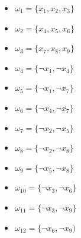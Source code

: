 \documentclass{beamer}
\begin{document}
\begin{frame}
\begin{columns}[t]
\begin{column}[T]{.6\textwidth}
\begin{tikzpicture}[scale=0.8, every node/.style={scale=0.8}]
\end{tikzpicture}
\end{column}
\begin{column}[T]{.4\textwidth}
	\scriptsize
	\begin{itemize} 
	\item[] $\omega_{1} = \{x_1  ,  x_2  ,  x_3\}$
	\item[] $\omega_{2} = \{x_4  ,  x_5  ,  x_6\} $
	\item[] $\omega_{3} = \{x_7  ,  x_8  ,  x_9\} $
	\item[] $\omega_{4} = \{\neg x_1  ,  \neg x_4\} $
	\item[] $\omega_{5} = \{\neg x_1  ,  \neg x_7\} $
	\item[] $\omega_{6} = \{\neg x_4  ,  \neg x_7\} $
	\item[] $\omega_{7} = \{\neg x_2  ,  \neg x_5\} $
	\item[] $\omega_{8} = \{\neg x_2  ,  \neg x_8\} $
	\item[] $\omega_{9} = \{\neg x_5  ,  \neg x_8\} $
	\item[] $\omega_{10} = \{\neg x_3  ,  \neg x_6\} $
	\item[] $\omega_{11} = \{\neg x_3  ,  \neg x_9\} $
	\item[] $\omega_{12} = \{\neg x_6  ,  \neg x_9) $
	\end{itemize}
	\end{column}
\end{columns}
\end{frame}
\end{document}
